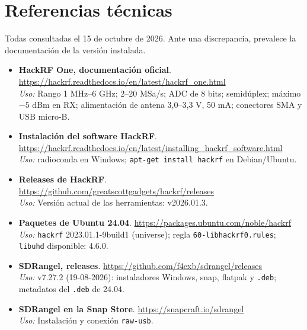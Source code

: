 

\section{Referencias técnicas}
\label{sec:referencias}

Todas consultadas el 15 de octubre de 2026. Ante una discrepancia, prevalece la documentación de la versión instalada.

\begin{itemize}[itemsep=0.45em]
  \item \textbf{HackRF One, documentación oficial}. \url{https://hackrf.readthedocs.io/en/latest/hackrf_one.html}\\
    \emph{Uso:} Rango 1 MHz--6 GHz; 2--20 MSa/s; ADC de 8 bits; semidúplex; máximo $-5$ dBm en RX; alimentación de antena 3,0--3,3 V, 50 mA; conectores SMA y USB micro-B.
  \item \textbf{Instalación del software HackRF}. \url{https://hackrf.readthedocs.io/en/latest/installing_hackrf_software.html}\\
    \emph{Uso:} radioconda en Windows; \texttt{apt-get install hackrf} en Debian/Ubuntu.
  \item \textbf{Releases de HackRF}. \url{https://github.com/greatscottgadgets/hackrf/releases}\\
    \emph{Uso:} Versión actual de las herramientas: v2026.01.3.
  \item \textbf{Paquetes de Ubuntu 24.04}. \url{https://packages.ubuntu.com/noble/hackrf}\\
    \emph{Uso:} \texttt{hackrf} 2023.01.1-9build1 (universe); regla \texttt{60-libhackrf0.rules}; \texttt{libuhd} disponible: 4.6.0.
  \item \textbf{SDRangel, releases}. \url{https://github.com/f4exb/sdrangel/releases}\\
    \emph{Uso:} v7.27.2 (19-08-2026): instaladores Windows, snap, flatpak y \texttt{.deb}; metadatos del \texttt{.deb} de 24.04.
  \item \textbf{SDRangel en la Snap Store}. \url{https://snapcraft.io/sdrangel}\\
    \emph{Uso:} Instalación y conexión \texttt{raw-usb}.

\end{itemize}
